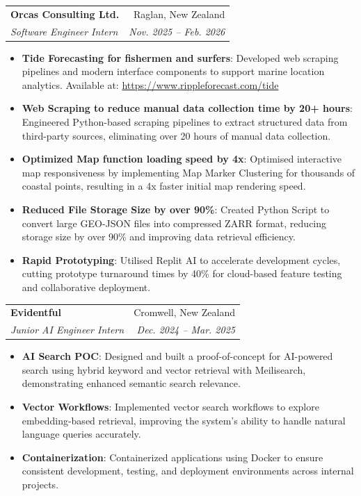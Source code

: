 \documentclass[letterpaper,11pt]{article}
\makeatletter
\newcommand{\resumeItem}[2]{
  \item\small{
    \textbf{#1}{: #2 \vspace{-2pt}}
  }
}
\newcommand{\resumeSubheading}[4]{
  \vspace{-1pt}\item
    \begin{tabular*}{0.97\textwidth}{l@{\extracolsep{\fill}}r}
      \textbf{#1} & #2 \\
      \textit{\small#3} & \textit{\small #4} \\
    \end{tabular*}\vspace{-5pt}
}
\newcommand{\resumeItemListStart}{\begin{itemize}}
\newcommand{\resumeItemListEnd}{\end{itemize}\vspace{-5pt}}
\makeatother
\begin{document}
    \resumeSubheading
      {Orcas Consulting Ltd.}{Raglan, New Zealand}
      {Software Engineer Intern}{Nov. 2025 -- Feb. 2026}
      \resumeItemListStart
        \resumeItem{Tide Forecasting for fishermen and surfers}
          {Developed web scraping pipelines and modern interface components to support marine location analytics. Available at: \url{https://www.rippleforecast.com/tide}}
        \resumeItem{Web Scraping to reduce manual data collection time by 20+ hours}
          {Engineered Python-based scraping pipelines to extract structured data from third-party sources, eliminating over 20 hours of manual data collection.}
        \resumeItem{Optimized Map function loading speed by 4x}
          {Optimised interactive map responsiveness by implementing Map Marker Clustering for thousands of coastal points, resulting in a 4x faster initial map rendering speed.}
        \resumeItem{Reduced File Storage Size by over 90\%}
          {Created Python Script to convert large GEO-JSON files into compressed ZARR format, reducing storage size by over 90\% and improving data retrieval efficiency.}
        \resumeItem{Rapid Prototyping}
          {Utilised Replit AI to accelerate development cycles, cutting prototype turnaround times by 40\% for cloud-based feature testing and collaborative deployment.}
      \resumeItemListEnd

    \resumeSubheading
      {Evidentful}{Cromwell, New Zealand}
      {Junior AI Engineer Intern}{Dec. 2024 -- Mar. 2025}
      \resumeItemListStart
        \resumeItem{AI Search POC}
          {Designed and built a proof-of-concept for AI-powered search using hybrid keyword and vector retrieval with Meilisearch, demonstrating enhanced semantic search relevance.}
        \resumeItem{Vector Workflows}
          {Implemented vector search workflows to explore embedding-based retrieval, improving the system's ability to handle natural language queries accurately.}
        \resumeItem{Containerization}
          {Containerized applications using Docker to ensure consistent development, testing, and deployment environments across internal projects.}
      \resumeItemListEnd
\end{document}
